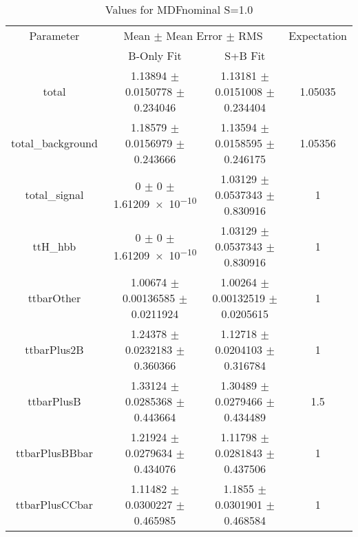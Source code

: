 \begin{table}
\centering
\caption{Values for MDFnominal S=1.0}
\begin{tabular}{cccc}
\toprule
Parameter & \multicolumn{2}{c}{Mean $\pm$ Mean Error $\pm$ RMS} & Expectation\\
 & B-Only Fit & S+B Fit & \\
\midrule
total & \num{1.13894} $\pm$ \num{0.0150778} $\pm$ \num{0.234046} & \num{1.13181} $\pm$ \num{0.0151008} $\pm$ \num{0.234404} & \num{1.05035}\\
total\_background & \num{1.18579} $\pm$ \num{0.0156979} $\pm$ \num{0.243666} & \num{1.13594} $\pm$ \num{0.0158595} $\pm$ \num{0.246175} & \num{1.05356}\\
total\_signal & \num{0} $\pm$ \num{0} $\pm$ \num{1.61209e-10} & \num{1.03129} $\pm$ \num{0.0537343} $\pm$ \num{0.830916} & \num{1}\\
ttH\_hbb & \num{0} $\pm$ \num{0} $\pm$ \num{1.61209e-10} & \num{1.03129} $\pm$ \num{0.0537343} $\pm$ \num{0.830916} & \num{1}\\
ttbarOther & \num{1.00674} $\pm$ \num{0.00136585} $\pm$ \num{0.0211924} & \num{1.00264} $\pm$ \num{0.00132519} $\pm$ \num{0.0205615} & \num{1}\\
ttbarPlus2B & \num{1.24378} $\pm$ \num{0.0232183} $\pm$ \num{0.360366} & \num{1.12718} $\pm$ \num{0.0204103} $\pm$ \num{0.316784} & \num{1}\\
ttbarPlusB & \num{1.33124} $\pm$ \num{0.0285368} $\pm$ \num{0.443664} & \num{1.30489} $\pm$ \num{0.0279466} $\pm$ \num{0.434489} & \num{1.5}\\
ttbarPlusBBbar & \num{1.21924} $\pm$ \num{0.0279634} $\pm$ \num{0.434076} & \num{1.11798} $\pm$ \num{0.0281843} $\pm$ \num{0.437506} & \num{1}\\
ttbarPlusCCbar & \num{1.11482} $\pm$ \num{0.0300227} $\pm$ \num{0.465985} & \num{1.1855} $\pm$ \num{0.0301901} $\pm$ \num{0.468584} & \num{1}\\
\bottomrule
\end{tabular}
\end{table}